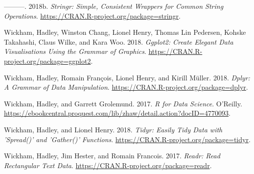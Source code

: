 \documentclass[]{book}
\begin{document}
\leavevmode\hypertarget{ref-R-stringr}{}%
---------. 2018b. \emph{Stringr: Simple, Consistent Wrappers for Common String Operations}. \url{https://CRAN.R-project.org/package=stringr}.

\leavevmode\hypertarget{ref-R-ggplot2}{}%
Wickham, Hadley, Winston Chang, Lionel Henry, Thomas Lin Pedersen, Kohske Takahashi, Claus Wilke, and Kara Woo. 2018. \emph{Ggplot2: Create Elegant Data Visualisations Using the Grammar of Graphics}. \url{https://CRAN.R-project.org/package=ggplot2}.

\leavevmode\hypertarget{ref-R-dplyr}{}%
Wickham, Hadley, Romain François, Lionel Henry, and Kirill Müller. 2018. \emph{Dplyr: A Grammar of Data Manipulation}. \url{https://CRAN.R-project.org/package=dplyr}.

\leavevmode\hypertarget{ref-wickham2017}{}%
Wickham, Hadley, and Garrett Grolemund. 2017. \emph{R for Data Science}. O'Reilly. \url{https://ebookcentral.proquest.com/lib/zhaw/detail.action?docID=4770093}.

\leavevmode\hypertarget{ref-R-tidyr}{}%
Wickham, Hadley, and Lionel Henry. 2018. \emph{Tidyr: Easily Tidy Data with 'Spread()' and 'Gather()' Functions}. \url{https://CRAN.R-project.org/package=tidyr}.

\leavevmode\hypertarget{ref-R-readr}{}%
Wickham, Hadley, Jim Hester, and Romain Francois. 2017. \emph{Readr: Read Rectangular Text Data}. \url{https://CRAN.R-project.org/package=readr}.
\end{document}
